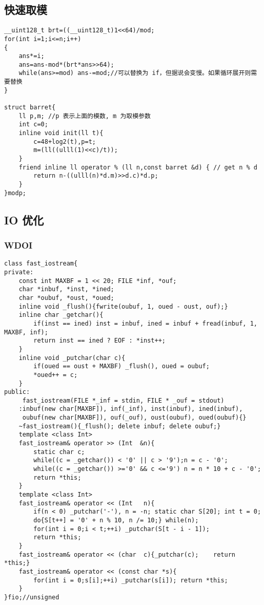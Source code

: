 \documentclass[12pt]{ctexart}
\begin{document}
\subsection{快速取模}

\begin{lstlisting}
__uint128_t brt=((__uint128_t)1<<64)/mod;
for(int i=1;i<=n;i++)
{
	ans*=i;
	ans=ans-mod*(brt*ans>>64);
	while(ans>=mod) ans-=mod;//可以替换为 if，但据说会变慢。如果循环展开则需要替换
}

struct barret{
    ll p,m; //p 表示上面的模数, m 为取模参数
    int c=0;
    inline void init(ll t){
    	c=48+log2(t),p=t;
		m=(ll((ulll(1)<<c)/t));
	}
    friend inline ll operator % (ll n,const barret &d) { // get n % d
        return n-((ulll(n)*d.m)>>d.c)*d.p;
    }
}modp;
\end{lstlisting}

\subsection{IO 优化}

\subsubsection{WDOI}

\begin{lstlisting}
class fast_iostream{
private:
	const int MAXBF = 1 << 20; FILE *inf, *ouf;
	char *inbuf, *inst, *ined;
	char *oubuf, *oust, *oued;
	inline void _flush(){fwrite(oubuf, 1, oued - oust, ouf);}
	inline char _getchar(){
		if(inst == ined) inst = inbuf, ined = inbuf + fread(inbuf, 1, MAXBF, inf);
		return inst == ined ? EOF : *inst++;
	}
	inline void _putchar(char c){
		if(oued == oust + MAXBF) _flush(), oued = oubuf;
		*oued++ = c;
	}
public:
	 fast_iostream(FILE *_inf = stdin, FILE * _ouf = stdout)
	:inbuf(new char[MAXBF]), inf(_inf), inst(inbuf), ined(inbuf),
	 oubuf(new char[MAXBF]), ouf(_ouf), oust(oubuf), oued(oubuf){}
	~fast_iostream(){_flush(); delete inbuf; delete oubuf;}
	template <class Int>
	fast_iostream& operator >> (Int  &n){
		static char c;
		while((c = _getchar()) < '0' || c > '9');n = c - '0';
		while((c = _getchar()) >='0' && c <='9') n = n * 10 + c - '0';
		return *this;
	}
	template <class Int>
	fast_iostream& operator << (Int   n){
		if(n < 0) _putchar('-'), n = -n; static char S[20]; int t = 0;
		do{S[t++] = '0' + n % 10, n /= 10;} while(n);
		for(int i = 0;i < t;++i) _putchar(S[t - i - 1]);
		return *this;
	}
	fast_iostream& operator << (char  c){_putchar(c);    return *this;}
	fast_iostream& operator << (const char *s){
		for(int i = 0;s[i];++i) _putchar(s[i]); return *this;
	}
}fio;//unsigned
\end{lstlisting}
\end{document}
